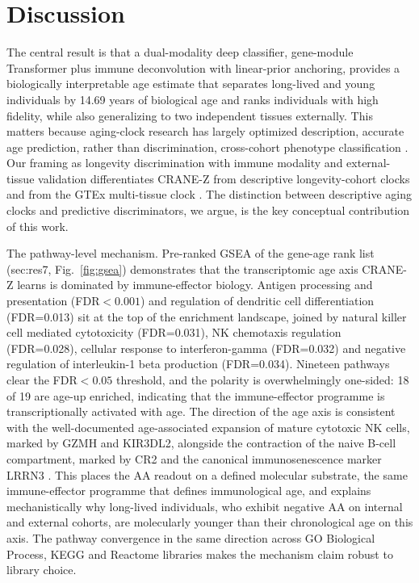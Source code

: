 \documentclass[unnumsec,webpdf,contemporary,large]{oup-authoring-template}
\begin{document}
\section{Discussion}\label{sec:disc}
The central result is that a dual-modality deep classifier, gene-module Transformer plus immune deconvolution with linear-prior anchoring, provides a biologically interpretable age estimate that separates long-lived and young individuals by 14.69 years of biological age and ranks individuals with high fidelity, while also generalizing to two independent tissues externally. This matters because aging-clock research has largely optimized description, accurate age prediction, rather than discrimination, cross-cohort phenotype classification \cite{mamoshina2019applications,frenk2021mechanistic,bergsma2021centenarian,liu2023immune,zhang2023clock}. Our framing as longevity discrimination with immune modality and external-tissue validation differentiates CRANE-Z from descriptive longevity-cohort clocks and from the GTEx multi-tissue clock \cite{orange2026brief}. The distinction between descriptive aging clocks and predictive discriminators, we argue, is the key conceptual contribution of this work.

The pathway-level mechanism. Pre-ranked GSEA of the gene-age rank list (sec:res7, Fig.~\ref{fig:gsea}) demonstrates that the transcriptomic age axis CRANE-Z learns is dominated by immune-effector biology. Antigen processing and presentation (FDR$<0.001$) and regulation of dendritic cell differentiation (FDR=0.013) sit at the top of the enrichment landscape, joined by natural killer cell mediated cytotoxicity (FDR=0.031), NK chemotaxis regulation (FDR=0.028), cellular response to interferon-gamma (FDR=0.032) and negative regulation of interleukin-1 beta production (FDR=0.034). Nineteen pathways clear the FDR$<0.05$ threshold, and the polarity is overwhelmingly one-sided: 18 of 19 are age-up enriched, indicating that the immune-effector programme is transcriptionally activated with age. The direction of the age axis is consistent with the well-documented age-associated expansion of mature cytotoxic NK cells, marked by GZMH and KIR3DL2, alongside the contraction of the naive B-cell compartment, marked by CR2 and the canonical immunosenescence marker LRRN3 \cite{franceschi2018inflammaging,goronzy2017fifty,fulop2018immunosenescence,nikolich2008ageing,pawelec2018conundrum,weng2006aging,shaw2010aging,solana2012innate,lopez2013hallmarks,lopez2023hallmarks}. This places the AA readout on a defined molecular substrate, the same immune-effector programme that defines immunological age, and explains mechanistically why long-lived individuals, who exhibit negative AA on internal and external cohorts, are molecularly younger than their chronological age on this axis. The pathway convergence in the same direction across GO Biological Process, KEGG and Reactome libraries makes the mechanism claim robust to library choice.
\end{document}
